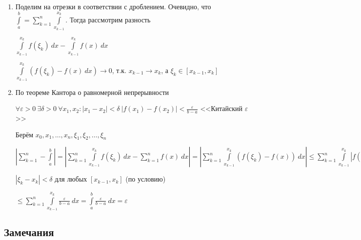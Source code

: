\documentclass{article}
\begin{document}
		\begin{enumerate}
			\item Поделим на отрезки в соответствии с дроблением. Очевидно, что $\int\limits^b_a = \sum\limits^n_{k = 1} \int\limits^{x_k}_{x_{k - 1}}$. Тогда рассмотрим разность

				$\int\limits^{x_k}_{x_{k - 1}} f(\xi_k) \ dx - \int\limits^{x_k}_{x_{k - 1}} f(x) \ dx$

				$\int\limits^{x_k}_{x_{k - 1}} (f(\xi_k) - f(x) \ dx) \rightarrow 0$, т.к. $x_{k - 1} \rightarrow x_k$, а $\xi_k \in [x_{k - 1}, x_k]$

			\item По теореме Кантора о равномерной непрерывности

				$\forall \varepsilon > 0 \ \exists \delta > 0 \ \forall x_1, x_2: \left| x_1 - x_2 \right| < \delta \ \left| f(x_1) - f(x_2) \right| < \frac{\varepsilon}{b - a}$ <<Китайский $\varepsilon$>>

				Берём $x_0, x_1, \ldots, x_n, \xi_1, \xi_2, \ldots, \xi_n$

				$\left| \sum\limits^n_{k = 1} - \int\limits^b_a \right| = \left| \sum\limits^n_{k = 1} \int\limits^{x_k}_{x_{k - 1}} f(\xi_k) \ dx - \sum\limits^n_{k = 1} f(x) \ dx \right| = \left| \sum\limits^n_{k = 1} \int\limits^{x_k}_{x_{k - 1}} \left( f(\xi_k) - f(x) \right) \ dx \right| \leq \sum\limits^n_{k = 1} \int\limits^{x_k}_{x_{k - 1}} \left| f(\xi_k) - f(x) \right| \ dx$

				$\left| \xi_k - x_k \right| < \delta$ для любых $[x_{k - 1}, x_k]$ (по условию)

				$\leq \sum\limits^n_{k = 1} \int\limits^{x_k}_{x_{k - 1}} \frac{\varepsilon}{b - a} \ dx = \int\limits^b_a \frac{\varepsilon}{b - a} \ dx = \varepsilon$

		\end{enumerate}

		\subsection{Замечания}
\end{document}
